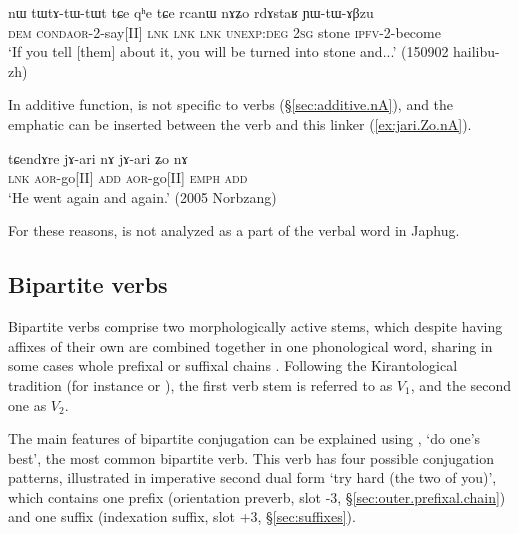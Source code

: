 \begin{exe}
\ex \label{ex:tWtAtWtWt.tCe}
\gll nɯ tɯ\redp{}tɤ-tɯ-tɯt tɕe qʰe tɕe rcanɯ nɤʑo rdɤstaʁ ɲɯ-tɯ-ɤβzu \\
\textsc{dem} \textsc{cond}\redp{}\textsc{aor}-2-say[II] \textsc{lnk} \textsc{lnk} \textsc{lnk} \textsc{unexp}:\textsc{deg} \textsc{2sg} stone \textsc{ipfv}-2-become \\
\glt `If you tell [them] about it, you will be turned into stone and...' (150902 hailibu-zh)
\end{exe}

In additive function,  is not specific to verbs (§\ref{sec:additive.nA}), and the emphatic  can be inserted between the verb and this linker (\ref{ex:jari.Zo.nA}).

\begin{exe}
\ex \label{ex:jari.Zo.nA}
\gll tɕendɤre jɤ-ari nɤ jɤ-ari ʑo nɤ \\
\textsc{lnk} \textsc{aor}-go[II] \textsc{add} \textsc{aor}-go[II] \textsc{emph} \textsc{add} \\
\glt `He went again and again.' (2005 Norbzang)
\end{exe}

For these reasons,  is not analyzed as a part of the verbal word in Japhug.

\subsection{Bipartite verbs} \label{sec:bipartite}
  
Bipartite verbs comprise two morphologically active stems, which despite having affixes of their own are combined together in one phonological word, sharing in some cases whole prefixal or suffixal chains \citep{jacques18bipartite}. Following the Kirantological tradition (for instance \citealt{doornenbal09} or \citealt{schackow15yakkha}), the first verb stem is referred to as $V_1$, and the second one as $V_2$.

The main features of bipartite conjugation can be explained using  , `do one's best', the most common bipartite verb. This verb has four possible conjugation patterns, illustrated in  imperative second dual form `try hard (the two of you)', which contains one prefix (orientation preverb, slot -3, §\ref{sec:outer.prefixal.chain}) and one suffix (indexation suffix, slot +3, §\ref{sec:suffixes}).
 
